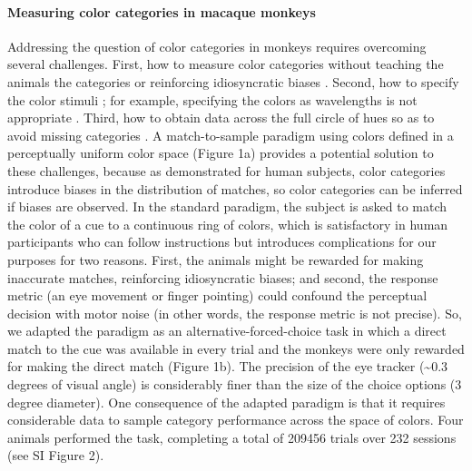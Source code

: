 \paragraph{Measuring color categories in macaque monkeys}

Addressing the question of color categories in monkeys requires overcoming several challenges. First, how to measure color categories without teaching the animals the categories or reinforcing idiosyncratic biases \citep{essock_color_1977,matsuno_color_2004}. Second, how to specify the color stimuli \citep{siuda-krzywicka_biological_2019}; for example, specifying the colors as wavelengths \citep{sandell_color_1979} is not appropriate \citep{davidoff_cross-species_2010}. 
Third, how to obtain data across the full circle of hues so as to avoid missing categories \citep{fagot_cross-species_2006}. A match-to-sample paradigm using colors defined in a perceptually uniform color space (Figure 1a) provides a potential solution to these challenges, because as demonstrated for human subjects\citep{bae_why_2015}, color categories introduce biases in the distribution of matches, so color categories can be inferred if biases are observed. In the standard paradigm, the subject is asked to match the color of a cue to a continuous ring of colors, which is satisfactory in human participants who can follow instructions but introduces complications for our purposes for two reasons. First, the animals might be rewarded for making inaccurate matches, reinforcing idiosyncratic biases; and second, the response metric (an eye movement or finger pointing) could confound the perceptual decision with motor noise (in other words, the response metric is not precise). So, we adapted the paradigm as an alternative-forced-choice task in which a direct match to the cue was available in every trial and the monkeys were only rewarded for making the direct match (Figure 1b). The precision of the eye tracker (\textasciitilde0.3 degrees of visual angle) is considerably finer than the size of the choice options (3 degree diameter). One consequence of the adapted paradigm is that it requires considerable data to sample category performance across the space of colors. Four animals performed the task, completing a total of 209456 trials over 232 sessions (see SI Figure 2).


